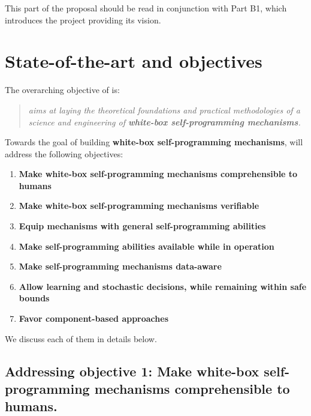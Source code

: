 This part of the proposal should be read in conjunction with Part B1,
which introduces the project providing its vision. 


\section{State-of-the-art and objectives}


The overarching objective of \project is:

\begin{quote}\textit{
\project aims at laying the theoretical foundations and practical
methodologies of a science and engineering of \textbf{white-box self-programming mechanisms}. 
}
\end{quote}


Towards the goal of building \textbf{white-box self-programming mechanisms}, \project will address the following objectives: %
\begin{enumerate}

\item \textbf{Make white-box self-programming mechanisms comprehensible to
    humans} 

\item \textbf{Make white-box self-programming mechanisms verifiable}

\item \textbf{Equip mechanisms with general self-programming abilities}

\item \textbf{Make self-programming abilities available while in operation} 

\item \textbf{Make self-programming mechanisms data-aware}


\item 
\textbf{Allow learning and stochastic decisions, while remaining within safe bounds}

\item \textbf{Favor component-based approaches}  
\end{enumerate}

We discuss each of them in details below.



\subsection{Addressing objective 1: Make white-box self-programming mechanisms
  comprehensible to humans.}

